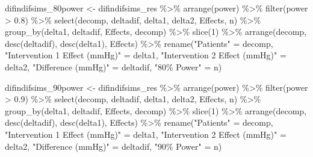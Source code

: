 \documentclass[
]{article}
\newenvironment{Shaded}{\begin{snugshade}}{\end{snugshade}}
\newcommand{\DecValTok}[1]{\textcolor[rgb]{0.00,0.00,0.81}{#1}}
\newcommand{\FloatTok}[1]{\textcolor[rgb]{0.00,0.00,0.81}{#1}}
\newcommand{\FunctionTok}[1]{\textcolor[rgb]{0.00,0.00,0.00}{#1}}
\newcommand{\NormalTok}[1]{#1}
\newcommand{\OtherTok}[1]{\textcolor[rgb]{0.56,0.35,0.01}{#1}}
\newcommand{\SpecialCharTok}[1]{\textcolor[rgb]{0.00,0.00,0.00}{#1}}
\newcommand{\StringTok}[1]{\textcolor[rgb]{0.31,0.60,0.02}{#1}}
\begin{document}
\begin{Shaded}
\begin{Highlighting}[]
\NormalTok{difindifsims\_80power }\OtherTok{\textless{}{-}}\NormalTok{ difindifsims\_res }\SpecialCharTok{\%\textgreater{}\%} 
  \FunctionTok{arrange}\NormalTok{(power) }\SpecialCharTok{\%\textgreater{}\%} 
  \FunctionTok{filter}\NormalTok{(power }\SpecialCharTok{\textgreater{}} \FloatTok{0.8}\NormalTok{) }\SpecialCharTok{\%\textgreater{}\%} 
  \FunctionTok{select}\NormalTok{(decomp, deltadif, delta1, delta2, Effects, n) }\SpecialCharTok{\%\textgreater{}\%} 
  \FunctionTok{group\_by}\NormalTok{(delta1, deltadif, Effects, decomp) }\SpecialCharTok{\%\textgreater{}\%} 
  \FunctionTok{slice}\NormalTok{(}\DecValTok{1}\NormalTok{) }\SpecialCharTok{\%\textgreater{}\%} 
  \FunctionTok{arrange}\NormalTok{(decomp, }\FunctionTok{desc}\NormalTok{(deltadif), }\FunctionTok{desc}\NormalTok{(delta1), Effects) }\SpecialCharTok{\%\textgreater{}\%} 
  \FunctionTok{rename}\NormalTok{(}\StringTok{"Patients"} \OtherTok{=}\NormalTok{ decomp,}
         \StringTok{"Intervention 1 Effect (mmHg)"} \OtherTok{=}\NormalTok{ delta1,}
         \StringTok{"Intervention 2 Effect (mmHg)"} \OtherTok{=}\NormalTok{ delta2,}
         \StringTok{"Difference (mmHg)"} \OtherTok{=}\NormalTok{ deltadif,}
         \StringTok{"80\% Power"} \OtherTok{=}\NormalTok{ n)}

\NormalTok{difindifsims\_90power }\OtherTok{\textless{}{-}}\NormalTok{ difindifsims\_res }\SpecialCharTok{\%\textgreater{}\%} 
  \FunctionTok{arrange}\NormalTok{(power) }\SpecialCharTok{\%\textgreater{}\%} 
  \FunctionTok{filter}\NormalTok{(power }\SpecialCharTok{\textgreater{}} \FloatTok{0.9}\NormalTok{) }\SpecialCharTok{\%\textgreater{}\%} 
  \FunctionTok{select}\NormalTok{(decomp, deltadif, delta1, delta2, Effects, n) }\SpecialCharTok{\%\textgreater{}\%} 
  \FunctionTok{group\_by}\NormalTok{(delta1, deltadif, Effects, decomp) }\SpecialCharTok{\%\textgreater{}\%} 
  \FunctionTok{slice}\NormalTok{(}\DecValTok{1}\NormalTok{) }\SpecialCharTok{\%\textgreater{}\%} 
  \FunctionTok{arrange}\NormalTok{(decomp, }\FunctionTok{desc}\NormalTok{(deltadif), }\FunctionTok{desc}\NormalTok{(delta1), Effects) }\SpecialCharTok{\%\textgreater{}\%} 
  \FunctionTok{rename}\NormalTok{(}\StringTok{"Patients"} \OtherTok{=}\NormalTok{ decomp,}
         \StringTok{"Intervention 1 Effect (mmHg)"} \OtherTok{=}\NormalTok{ delta1,}
         \StringTok{"Intervention 2 Effect (mmHg)"} \OtherTok{=}\NormalTok{ delta2,}
         \StringTok{"Difference (mmHg)"} \OtherTok{=}\NormalTok{ deltadif,}
         \StringTok{"90\% Power"} \OtherTok{=}\NormalTok{ n)}


\end{Highlighting}
\end{Shaded}
\end{document}

